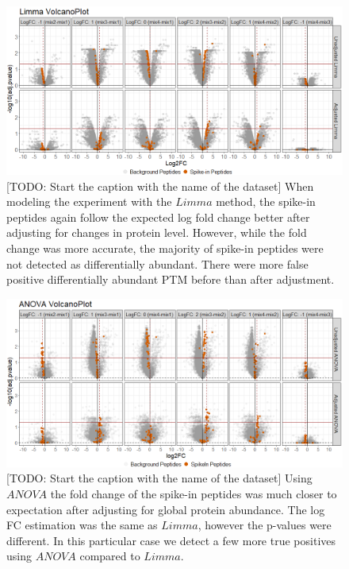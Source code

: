 \documentclass{mcp}
\def\todo#1{{\color{red}[TODO: #1]}}
\begin{document}
\begin{figure}[h!]
\centering
\includegraphics[width=1\textwidth]{sim_new/spike_in_limma_volcano}
\caption{\todo{Start the caption with the name of the dataset} When modeling the experiment with the $Limma$ method, the spike-in peptides again follow the expected log fold change better after adjusting for changes in protein level. However, while the fold change was more accurate, the majority of spike-in peptides were not detected as differentially abundant. There were more false positive differentially abundant PTM before than after adjustment. \label{fig:spike_volcano_limma}}
\end{figure}

\begin{figure}[h!]
\centering
\includegraphics[width=1\textwidth]{sim_new/spike_in_anova_volcano}
\caption{\todo{Start the caption with the name of the dataset} Using $ANOVA$ the fold change of the spike-in peptides was much closer to expectation after adjusting for global protein abundance. The log FC estimation was the same as $Limma$, however the p-values were different. In this particular case we detect a few more true positives using $ANOVA$ compared to $Limma$.\label{fig:spike_volcano_ttest}}
\end{figure}
\end{document}
